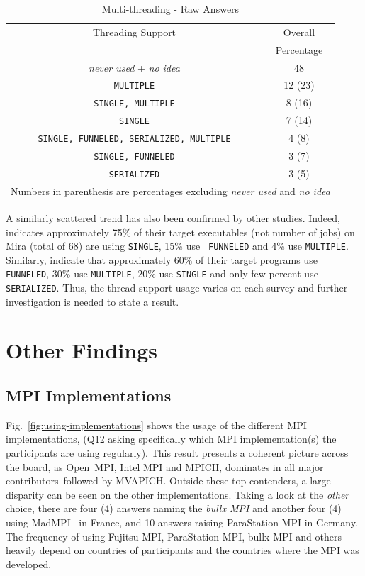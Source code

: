 \documentclass[preprint,5p,times]{elsarticle}
\def\myquote#1{{\it #1}}
\def\mcountries{major contributors\xspace{}}%
\begin{document}
\begin{table}[htb]%
  \begin{center}%
    \caption{Multi-threading - Raw Answers}\label{tab:multi-thread-raw}%
    \begin{tabular}{c|c}%
      \hline%
      Threading Support & Overall \\
      & Percentage \\
      \hline%
      \myquote{never used} + \myquote{no idea} & 48 \\
              {\tt MULTIPLE} & 12 (23) \\
              {\tt SINGLE, MULTIPLE} & 8 (16) \\
              {\tt SINGLE} & 7 (14) \\
              {\small\tt SINGLE, FUNNELED, SERIALIZED, MULTIPLE} & 4 (8) \\
              {\tt SINGLE, FUNNELED} & 3 (7) \\
              {\tt SERIALIZED} & 3 (5) \\
              \hline%
              \multicolumn{2}{c}{\footnotesize Numbers in parenthesis are
                percentages excluding \myquote{never used} and \myquote{no
                  idea}}
    \end{tabular}%
  \end{center}%
\end{table}%

A similarly scattered trend has also been confirmed by other studies. Indeed,
\cite{8665758} indicates approximately 75\% of their target executables (not
number of jobs) on Mira (total of 68) are using {\tt SINGLE}, 15\% use {\tt
FUNNELED} and 4\% use {\tt MULTIPLE}. Similarly, \cite{10.1145/3295500.3356176}
indicate that approximately 60\% of their target programs use {\tt FUNNELED},
30\% use {\tt MULTIPLE}, 20\% use {\tt SINGLE} and only few percent use {\tt
SERIALIZED}. Thus, the thread support usage varies on each survey and further
investigation is needed to state a result.

\section{Other Findings}

\subsection{MPI Implementations}

 Fig.~\ref{fig:using-implementations} shows the usage of the different MPI
 implementations, (Q12 asking specifically which MPI implementation(s) the
 participants are using regularly). This result presents a coherent picture
 across the board, as Open~MPI, Intel MPI and MPICH, dominates in all
 \mcountries\ followed by MVAPICH. Outside these top contenders, a large
 disparity can be seen on the other implementations. Taking a look at the
 \myquote{other} choice, there are four (4) answers naming the \myquote{bullx
 MPI} and another four (4) using MadMPI~\cite{madmpi} in France, and 10 answers
 raising ParaStation MPI in Germany. The frequency of using Fujitsu MPI,
 ParaStation MPI, bullx MPI and others heavily depend on countries of
 participants and the countries where the MPI was developed.
\end{document}
